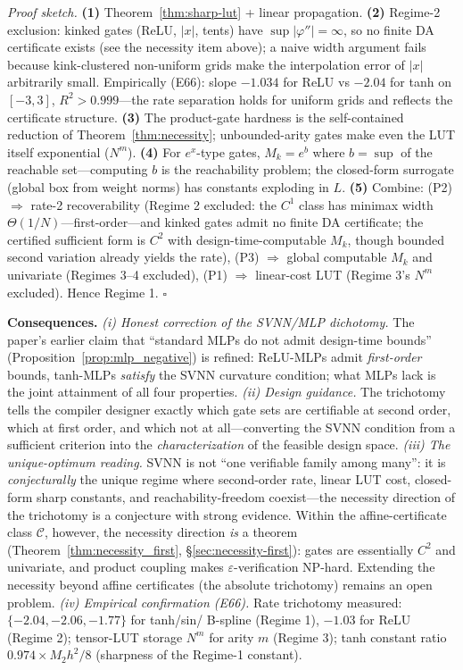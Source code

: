 \vspace{2pt}
\noindent\textit{Proof sketch.}
\textbf{(1)} Theorem~\ref{thm:sharp-lut} + linear propagation.
\textbf{(2)} Regime-2 exclusion: kinked gates (ReLU, $|x|$, tents) have
$\sup|\varphi''| = \infty$, so no finite DA certificate exists (see the
necessity item above); a naive width argument fails because
kink-clustered non-uniform grids make the interpolation error of $|x|$
arbitrarily small. Empirically (E66): slope $-1.034$ for ReLU vs
$-2.04$ for tanh on $[-3,3]$, $R^2 > 0.999$---the rate separation holds
for uniform grids and reflects the certificate structure. \textbf{(3)} The product-gate hardness is the self-contained
reduction of Theorem~\ref{thm:necessity}; unbounded-arity gates make
even the LUT itself exponential ($N^m$). \textbf{(4)} For $e^x$-type
gates, $M_k = e^b$ where $b = \sup$ of the reachable set---computing $b$
is the reachability problem; the closed-form surrogate (global box from
weight norms) has constants exploding in $L$. \textbf{(5)} Combine:
(P2) $\Rightarrow$ rate-2 recoverability (Regime 2 excluded: the $C^1$
class has minimax width $\Theta(1/N)$---first-order---and kinked gates
admit no finite DA certificate; the certified sufficient form is $C^2$
with design-time-computable $M_k$, though bounded second variation
already yields the rate), (P3)
$\Rightarrow$ global computable $M_k$ and univariate (Regimes 3--4
excluded), (P1) $\Rightarrow$ linear-cost LUT (Regime 3's $N^m$
excluded). Hence Regime 1. $\square$

\vspace{2pt}
\noindent\textbf{Consequences.}
\textit{(i) Honest correction of the SVNN/MLP dichotomy.} The paper's
earlier claim that ``standard MLPs do not admit design-time bounds''
(Proposition~\ref{prop:mlp_negative}) is refined: ReLU-MLPs admit
\emph{first-order} bounds, tanh-MLPs \emph{satisfy} the SVNN curvature
condition; what MLPs lack is the joint attainment of all four properties.
\textit{(ii) Design guidance.} The trichotomy tells the compiler designer
exactly which gate sets are certifiable at second order, which at first
order, and which not at all---converting the SVNN condition from a
sufficient criterion into the \emph{characterization} of the feasible
design space. \textit{(iii) The unique-optimum reading.} SVNN is not
``one verifiable family among many'': it is \emph{conjecturally} the
unique regime where second-order rate, linear LUT cost, closed-form
sharp constants, and reachability-freedom coexist---the necessity
direction of the trichotomy is a conjecture with strong evidence.
Within the affine-certificate class $\mathcal{C}$, however, the
necessity direction \emph{is} a theorem
(Theorem~\ref{thm:necessity_first}, {\S}\ref{sec:necessity-first}):
gates are essentially $C^2$ and univariate, and product coupling makes
$\varepsilon$-verification NP-hard. Extending the necessity beyond
affine certificates (the absolute trichotomy) remains an open problem.
\textit{(iv) Empirical confirmation (E66).}
Rate trichotomy measured: $\{-2.04, -2.06, -1.77\}$ for tanh/sin/
B-spline (Regime 1), $-1.03$ for ReLU (Regime 2); tensor-LUT storage
$N^m$ for arity $m$ (Regime 3); tanh constant ratio $0.974 \times
M_2 h^2/8$ (sharpness of the Regime-1 constant).


